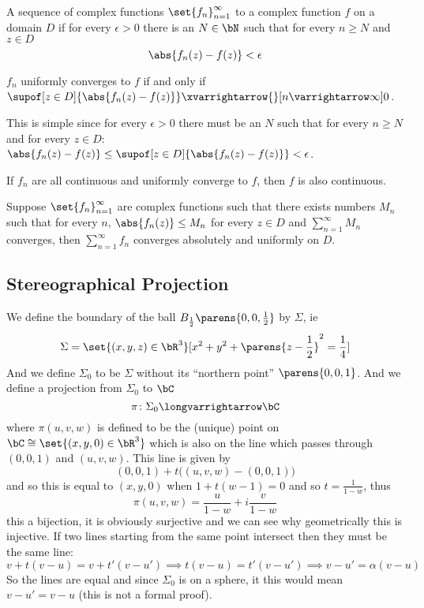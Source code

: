 \documentclass[10pt]{article}
\begin{document}
\begin{defn*}

    A sequence of complex functions $\set{f_n}_{n=1}^\infty$  to a complex function $f$ on a domain $D$ if for every $\epsilon>0$ there is an $N\in\bN$ such that for every
    $n\geq N$ and $z\in D$
    \[ \abs{f_n(z) - f(z)} < \epsilon \]

\end{defn*}

\begin{prop*}

    $f_n$ uniformly converges to $f$ if and only if $\supof[z\in D]{\abs{f_n(z)-f(z)}}\xvarrightarrow{}[n\varrightarrow\infty]0$.

\end{prop*}

This is simple since for every $\epsilon>0$ there must be an $N$ such that for every $n\geq N$ and for every $z\in D$: $\abs{f_n(z)-f(z)}\leq\supof[z\in D]{\abs{f_n(z)-f(z)}}<\epsilon$.

\begin{prop*}

    If $f_n$ are all continuous and uniformly converge to $f$, then $f$ is also continuous.

\end{prop*}

\begin{thrm*}

    Suppose $\set{f_n}_{n=1}^\infty$ are complex functions such that there exists numbers $M_n$ such that for every $n$, $\abs{f_n(z)}\leq M_n$ for every $z\in D$ and $\sum_{n=1}^\infty M_n$ converges, then
    $\sum_{n=1}^\infty f_n$ converges absolutely and uniformly on $D$.

\end{thrm*}

\subsection{Stereographical Projection}

We define the boundary of the ball $B_{\frac12}\parens{0,0,\frac12}$ by $\Sigma$, ie
\[ \Sigma = \set{(x,y,z)\in\bR^3}[x^2+y^2+\parens{z-\frac12}^2=\frac14] \]
And we define $\Sigma_0$ to be $\Sigma$ without its ``northern point'' $\parens{0,0,1}$.
And we define a projection from $\Sigma_0$ to $\bC$
\[ \pi\colon\Sigma_0\longvarrightarrow\bC \]
where $\pi(u,v,w)$ is defined to be the (unique) point on $\bC\cong\set{(x,y,0)\in\bR^3}$ which is also on the line which passes through $(0,0,1)$ and $(u,v,w)$.
This line is given by
\[ (0,0,1) + t\bigl((u,v,w) - (0,0,1)\bigr) \]
and so this is equal to $(x,y,0)$ when $1+t(w-1)=0$ and so $t=\frac1{1-w}$, thus
\[ \pi(u,v,w) = \frac u{1-w} + i\frac v{1-w} \]
this a bijection, it is obviously surjective and we can see why geometrically this is injective.
If two lines starting from the same point intersect then they must be the same line:
\[ v + t(v-u) = v + t'(v-u') \implies t(v-u) = t'(v-u') \implies v-u' = \alpha(v-u) \]
So the lines are equal and since $\Sigma_0$ is on a sphere, it this would mean $v-u'=v-u$ (this is not a formal proof).
\end{document}
